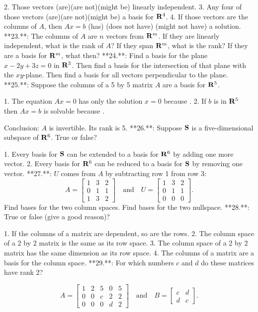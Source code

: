 2. Those vectors (are)(are not)(might be) linearly independent. 3. Any four of those vectors (are)(are not)(might be) a basis for \({\bf R}^{4}\). 4. If those vectors are the columns of \(A\), then \(Ax=b\) (has) (does not have) (might not have) a solution.
**23.**: The columns of \(A\) are \(n\) vectors from \({\bf R}^{m}\). If they are linearly independent, what is the rank of \(A\)? If they span \({\bf R}^{m}\), what is the rank? If they are a basis for \({\bf R}^{m}\), what then?
**24.**: Find a basis for the plane \(x-2y+3z=0\) in \({\bf R}^{3}\). Then find a basis for the intersection of that plane with the \(xy\)-plane. Then find a basis for all vectors perpendicular to the plane.
**25.**: Suppose the columns of a 5 by 5 matrix \(A\) are a basis for \({\bf R}^{5}\).

1. The equation \(Ax=0\) has only the solution \(x=0\) because .
2. If \(b\) is in \({\bf R}^{5}\) then \(Ax=b\) is solvable because .

Conclusion: \(A\) is invertible. Its rank is 5.
**26.**: Suppose \({\bf S}\) is a five-dimensional subspace of \({\bf R}^{6}\). True or false?

1. Every basis for \({\bf S}\) can be extended to a basis for \({\bf R}^{6}\) by adding one more vector.
2. Every basis for \({\bf R}^{6}\) can be reduced to a basis for \({\bf S}\) by removing one vector.
**27.**: \(U\) comes from \(A\) by subtracting row 1 from row 3: \[A=\begin{bmatrix}1&3&2\\ 0&1&1\\ 1&3&2\end{bmatrix}\quad\text{and}\quad U=\begin{bmatrix}1&3&2\\ 0&1&1\\ 0&0&0\end{bmatrix}.\] Find bases for the two column spaces. Find bases for the two nullspace.
**28.**: True or false (give a good reason)?

1. If the columns of a matrix are dependent, so are the rows.
2. The column space of a 2 by 2 matrix is the same as its row space.
3. The column space of a 2 by 2 matrix has the same dimension as its row space.
4. The columns of a matrix are a basis for the column space.
**29.**: For which numbers \(c\) and \(d\) do these matrices have rank 2?

\[A=\begin{bmatrix}1&2&5&0&5\\ 0&0&c&2&2\\ 0&0&0&d&2\end{bmatrix}\quad\text{and}\quad B=\begin{bmatrix}c&d\\ d&c\end{bmatrix}.\] 
